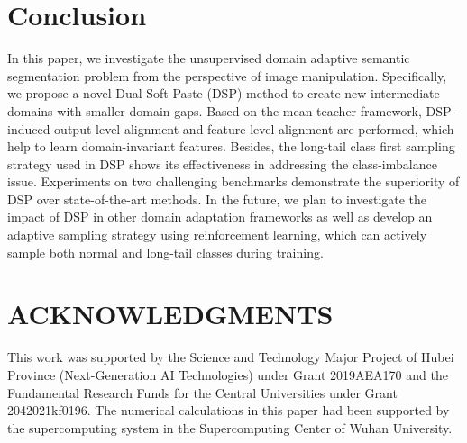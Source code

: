 \documentclass[sigconf]{acmart}
\begin{document}
\section{Conclusion}
In this paper, we investigate the unsupervised domain adaptive semantic segmentation problem from the perspective of image manipulation. Specifically, we propose a novel Dual Soft-Paste (DSP) method to create new intermediate domains with smaller domain gaps. Based on the mean teacher framework, DSP-induced output-level alignment and feature-level alignment are performed, which help to learn domain-invariant features. Besides, the long-tail class first sampling strategy used in DSP shows its effectiveness in addressing the class-imbalance issue. Experiments on two challenging benchmarks demonstrate the superiority of DSP over state-of-the-art methods. In the future, we plan to investigate the impact of DSP in other domain adaptation frameworks as well as develop an adaptive sampling strategy using reinforcement learning, which can actively sample both normal and long-tail classes during training. 
\section{ACKNOWLEDGMENTS}
This work was supported by the Science and Technology Major Project of Hubei Province (Next-Generation AI Technologies) under Grant 2019AEA170 and the Fundamental Research Funds for the Central Universities under Grant 2042021kf0196. The numerical calculations in this paper had been supported by the supercomputing system in the Supercomputing Center of Wuhan University.



\end{document}
